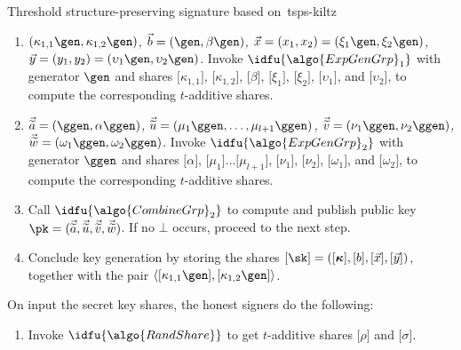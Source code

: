 \begin{protocolbox}{Threshold structure-preserving signature based
  on~\cite{C:KilPanWee15}}{tsps-kiltz}
\begin{description}
\begin{enumerate}
        \item \emph{$(\kappa_{1, 1}\gen, \kappa_{1,2}\gen)$, $\vec{{b}} =
          (\gen, \beta\gen)$, $\vec{{x}} = ({x}_1, {x}_2) = (\xi_1\gen,
        \xi_2\gen)$, $\vec{{y}} = ({y}_1, {y}_2) = (\upsilon_1\gen,
      \upsilon_2\gen)$.} Invoke $\idfu{\algo{ExpGenGrp}_1}$ with generator
      $\gen$ and shares $\lbrack \kappa_{1, 1}\rbrack $, $\lbrack \kappa_{1,
      2}\rbrack $, $\lbrack \beta \rbrack $, $\lbrack \xi_1\rbrack $, $\lbrack
      \xi_2\rbrack $, $\lbrack \upsilon_1\rbrack $, and $\lbrack
      \upsilon_2\rbrack $, to compute the corresponding $t$-additive shares.

    \item \emph{$\vec{\widetilde{a}} = (\ggen, \alpha\ggen)$,
      $\vec{\widetilde{u}} = (\mu_1\ggen, \ldots, \mu_{l+1}\ggen)$,
    $\vec{\widetilde{v}} = (\nu_1\ggen, \nu_2\ggen)$, $\vec{\widetilde{w}} =
  (\omega_1\ggen, \omega_2\ggen)$.} Invoke $\idfu{\algo{ExpGenGrp}_2}$ with
  generator $\ggen$ and shares $\lbrack \alpha\rbrack $, $\lbrack \mu_1\rbrack
  \ldots \lbrack \mu_{l+1}\rbrack $, $\lbrack \nu_1\rbrack $, $\lbrack
  \nu_2\rbrack $, $\lbrack \omega_1\rbrack $, and $\lbrack \omega_2\rbrack $,
  to compute the corresponding $t$-additive shares.

\item Call $\idfu{\algo{CombineGrp}_2}$ to compute and publish public key $\pk
  =(\vec{\widetilde{a}}, \vec{\widetilde{u}},
  \vec{\widetilde{v}},\vec{\widetilde{w}})$. If no $\bot$ occurs, proceed to
  the next step.

\item Conclude key generation by storing the shares $\lbrack \sk\rbrack  =
  (\lbrack \boldsymbol{\kappa}\rbrack , \lbrack {b}\rbrack , \lbrack
  \vec{{x}}\rbrack , \lbrack \vec{{y}}\rbrack )$, together with the pair
  $\langle \lbrack \kappa_{1, 1}\gen\rbrack ,\lbrack \kappa_{1, 2}\gen\rbrack
  \rangle$.

\end{enumerate}

\item[$\lbrack \signature\rbrack _{\algo{OffSign}} \sample
  \algo{OffSign}(\lbrack \sk\rbrack )$ :] On input the secret key shares, the
  honest signers do the following:

  \begin{enumerate}

    \item Invoke $\idfu{\algo{RandShare}}$ to get $t$-additive shares $\lbrack
      \rho\rbrack $ and $\lbrack \sigma\rbrack $.


\end{enumerate}
\end{description}
\end{protocolbox}
